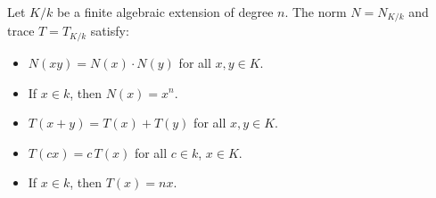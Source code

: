 Let $K/k$ be a finite algebraic extension of degree $n$. The norm $N = N_{K/k}$ and trace $T = T_{K/k}$ satisfy:
\begin{itemize}
\item[(a)] $N(xy) = N(x) \cdot N(y)$ for all $x, y \in K$.
\item[(b)] If $x \in k$, then $N(x) = x^n$.
\item[(c)] $T(x + y) = T(x) + T(y)$ for all $x, y \in K$.
\item[(d)] $T(cx) = c\,T(x)$ for all $c \in k$, $x \in K$.
\item[(e)] If $x \in k$, then $T(x) = n x$.
\end{itemize}
